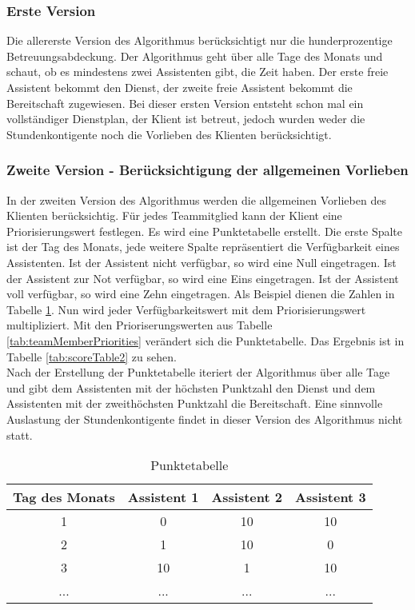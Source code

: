 \documentclass[12pt,a4paper,titlepage]{article} %
\begin{document}
\subsubsection{Erste Version}
\label{sec:algorithmVersion1}
Die allererste Version des Algorithmus berücksichtigt nur die hunderprozentige Betreuungsabdeckung. Der Algorithmus geht über alle Tage des Monats und schaut, ob es mindestens zwei Assistenten gibt, die Zeit haben. Der erste freie Assistent bekommt den Dienst, der zweite freie Assistent bekommt die Bereitschaft zugewiesen. Bei dieser ersten Version entsteht schon mal ein vollständiger Dienstplan, der Klient ist betreut, jedoch wurden weder die Stundenkontigente noch die Vorlieben des Klienten berücksichtigt.

\subsubsection{Zweite Version - Berücksichtigung der allgemeinen Vorlieben}
\label{sec:algorithmVersion2}

In der zweiten Version des Algorithmus werden die allgemeinen Vorlieben des Klienten berücksichtig. Für jedes Teammitglied kann der Klient eine Priorisierungswert festlegen. 
Es wird eine Punktetabelle erstellt. Die erste Spalte ist der Tag des Monats, jede weitere Spalte repräsentiert die Verfügbarkeit eines Assistenten. Ist der Assistent nicht verfügbar, so wird eine Null eingetragen. Ist der Assistent zur Not verfügbar, so wird eine Eins eingetragen. Ist der Assistent voll verfügbar, so wird eine Zehn eingetragen. Als Beispiel dienen die Zahlen in Tabelle \ref{tab:scoreTable}. Nun wird jeder Verfügbarkeitswert mit dem Priorisierungswert multipliziert. Mit den Prioriserungswerten  aus Tabelle \ref{tab:teamMemberPriorities} verändert sich die Punktetabelle. Das Ergebnis ist in Tabelle \ref{tab:scoreTable2} zu sehen. \\
Nach der Erstellung der Punktetabelle iteriert der Algorithmus über alle Tage und gibt dem Assistenten mit der höchsten Punktzahl den Dienst und dem Assistenten mit der zweithöchsten Punktzahl die Bereitschaft.
Eine sinnvolle Auslastung der Stundenkontigente findet in dieser Version des Algorithmus nicht statt.

\begin{table}[htb]
\centering
\begin{tabular}{|c|c|c|c|}
\hline 
Tag des Monats & Assistent 1 & Assistent 2 & Assistent 3 \\ 
\hline 
1 & 0 & 10 & 10 \\ 
\hline 
2 & 1 & 10 & 0 \\ 
\hline 
3 & 10 & 1 & 10 \\ 
\hline 
... & ... & ... & ... \\ 
\hline 
\end{tabular} 
\caption{Punktetabelle}
\label{tab:scoreTable}
\end{table}
\end{document}
